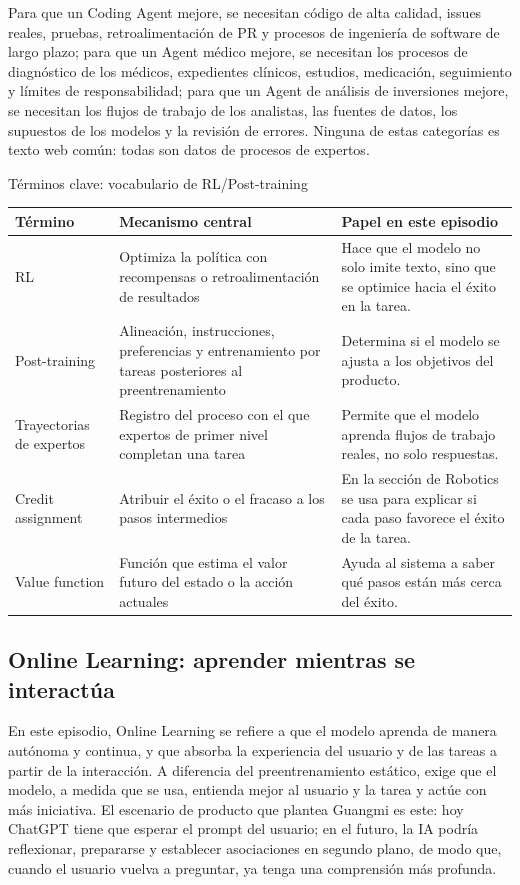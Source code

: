 \documentclass[a4paper]{article}
\begin{document}
Para que un Coding Agent mejore, se necesitan código de alta calidad, issues reales, pruebas, retroalimentación de PR y procesos de ingeniería de software de largo plazo; para que un Agent médico mejore, se necesitan los procesos de diagnóstico de los médicos, expedientes clínicos, estudios, medicación, seguimiento y límites de responsabilidad; para que un Agent de análisis de inversiones mejore, se necesitan los flujos de trabajo de los analistas, las fuentes de datos, los supuestos de los modelos y la revisión de errores. Ninguna de estas categorías es texto web común: todas son datos de procesos de expertos.

\begin{knowledgebox}{Términos clave: vocabulario de RL/Post-training}
\begin{tabularx}{\textwidth}{p{}p{}X}
\toprule
Término & Mecanismo central & Papel en este episodio \\
\midrule
RL & Optimiza la política con recompensas o retroalimentación de resultados & Hace que el modelo no solo imite texto, sino que se optimice hacia el éxito en la tarea. \\
Post-training & Alineación, instrucciones, preferencias y entrenamiento por tareas posteriores al preentrenamiento & Determina si el modelo se ajusta a los objetivos del producto. \\
Trayectorias de expertos & Registro del proceso con el que expertos de primer nivel completan una tarea & Permite que el modelo aprenda flujos de trabajo reales, no solo respuestas. \\
Credit assignment & Atribuir el éxito o el fracaso a los pasos intermedios & En la sección de Robotics se usa para explicar si cada paso favorece el éxito de la tarea. \\
Value function & Función que estima el valor futuro del estado o la acción actuales & Ayuda al sistema a saber qué pasos están más cerca del éxito. \\
\bottomrule
\end{tabularx}
\end{knowledgebox}

\subsection{Online Learning: aprender mientras se interactúa}

En este episodio, Online Learning se refiere a que el modelo aprenda de manera autónoma y continua, y que absorba la experiencia del usuario y de las tareas a partir de la interacción. A diferencia del preentrenamiento estático, exige que el modelo, a medida que se usa, entienda mejor al usuario y la tarea y actúe con más iniciativa. El escenario de producto que plantea Guangmi es este: hoy ChatGPT tiene que esperar el prompt del usuario; en el futuro, la IA podría reflexionar, prepararse y establecer asociaciones en segundo plano, de modo que, cuando el usuario vuelva a preguntar, ya tenga una comprensión más profunda.
\end{document}
